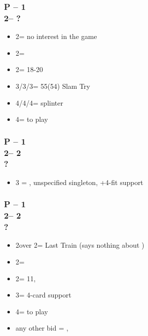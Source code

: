 \documentclass[12pt, a4paper]{article}
\begin{document}
\subsubsection*{P -- 1\spades \\ 2\clubs -- ?}
\begin{itemize}
    \item 2\spades = no interest in the game
    \item 2\diams = \inv
    \item 2\nt = 18-20 \bal
    \item 3\clubs/3\diams/3\hearts = 55(54) Slam Try
    \item 4\clubs/4\diams/4\hearts = splinter
    \item 4\spades = to play
\end{itemize}

\subsubsection*{P -- 1\majs \\ 2\clubs -- 2\majs \\ ?}
\begin{itemize}
    \item 3 = \nat, unspecified singleton, +4-fit \majs support
\end{itemize}

\subsubsection*{P -- 1\majs \\ 2\clubs -- 2\diams \\ ?}
\begin{itemize}
    \item 2\hearts over 2\spades = Last Train (says nothing about \hearts)
    \item 2\majs = \soff
    \item 2\nt = 11, \bal
    \item 3\majs = 4-card support
    \item 4\majs = to play
    \item any other bid = \nat, \inv
\end{itemize}

\end{document}

